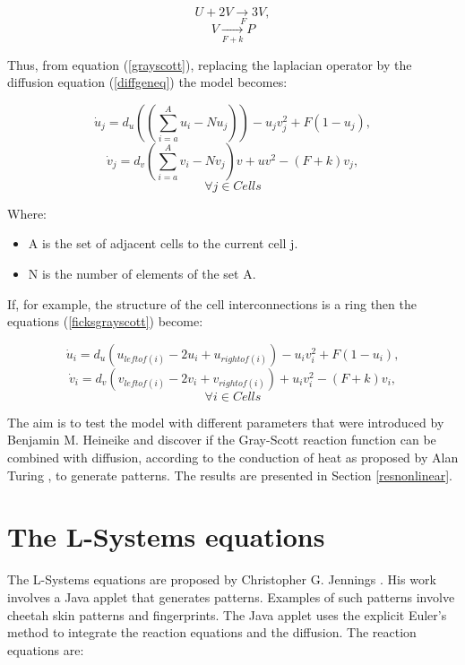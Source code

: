 $$U + 2V \underset{~F} \to 3V,$$
\begin{equation}
\label{gsreaction}
V \underset{F+k} \to P
\end{equation}

Thus, from equation (\ref{grayscott}), replacing the laplacian operator by the diffusion equation (\ref{diffgeneq}) the model becomes:


$$\dot{u}_j = d_u((\sum_{i=a}^{A} u_i - Nu_j)) - u_jv_j^2 + F(1-u_j),$$
\begin{equation}
\label{ficksgrayscott}
\dot{v}_j = d_v(\sum_{i=a}^{A} v_i - Nv_j) v + uv^2 - (F+k)v_j,
\end{equation}
$$\forall j \in Cells $$

Where:
\begin{itemize}
\item A is the set of adjacent cells to the current cell j. 
\item N is the number of elements of the set A. 
\end{itemize}
If, for example, the structure of the cell interconnections is a ring then the equations (\ref{ficksgrayscott}) become:


$$\dot{u}_i = d_u(u_{leftof(i)} - 2u_i + u_{rightof(i)}) - u_iv_i^2 + F(1-u_i),$$
\begin{equation}
\label{ficksgrayscottring}
\dot{v}_i = d_v(v_{leftof(i)} - 2v_i + v_{rightof(i)}) + u_iv_i^2 - (F+k)v_i,
\end{equation}
$$ \forall i \in Cells $$

The aim is to test the model with different parameters that were introduced by Benjamin M. Heineike \cite{heineike_modeling_2002} and discover if the Gray-Scott reaction function can be combined with diffusion, according to the conduction of heat as proposed by Alan Turing \cite{turing_chemical_1990}, to generate patterns. The results are presented in Section \ref{resnonlinear}. 
 
\section{The L-Systems equations}

The L-Systems equations are proposed by Christopher G. Jennings \cite{website:jennings}. His work involves a Java applet that generates patterns. Examples of such patterns involve cheetah skin patterns and fingerprints. The Java applet uses the explicit Euler's method to integrate the reaction equations and the diffusion. The reaction equations are:


